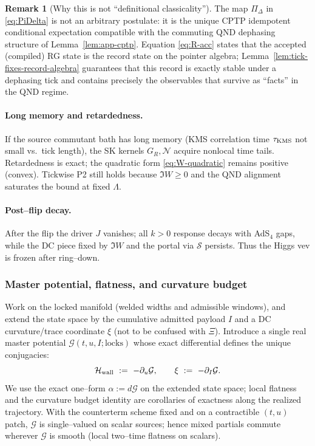 \documentclass[10pt]{article}
\theoremstyle{definition}
\newtheorem{remark}{Remark}[section]
\theoremstyle{plain}
\begin{document}
\begin{remark}[Why this is not ``definitional classicality'']
\label{rem:uom-main-004}
The map $\Pi_\Delta$ in \eqref{eq:PiDelta} is not an arbitrary postulate: it is the unique CPTP idempotent
conditional expectation compatible with the commuting QND dephasing structure of Lemma~\ref{lem:app-cptp}.
Equation \eqref{eq:R-acc} states that the accepted (compiled) RG state is the record state on the pointer
algebra; Lemma~\ref{lem:tick-fixes-record-algebra} guarantees that this record is exactly stable under
a dephasing tick and contains precisely the observables that survive as ``facts'' in the QND regime.
\end{remark}

\paragraph{Long memory and retardedness.}\label{par:uom-main-094}
If the source commutant bath has long memory (KMS correlation time $\tau_{\rm KMS}$ not small vs.\ tick length),
the SK kernels $G_R,\mathcal N$ acquire nonlocal time tails. Retardedness is exact; the quadratic form
\eqref{eq:W-quadratic} remains positive (convex). Tickwise P2 still holds because $\Im W\ge 0$ and the QND
alignment saturates the bound at fixed $\Lambda$.

\paragraph{Post--flip decay.}\label{par:uom-main-095}
After the flip the driver $J$ vanishes; all $k>0$ response decays with AdS$_4$ gaps, while the DC piece fixed
by $\Im W$ and the portal via $\mathcal S$ persists. Thus the Higgs vev is frozen after ring--down.

\subsubsection{Master potential, flatness, and curvature budget}
\label{subsubsec:master-potential}
Work on the locked manifold (welded widths and admissible windows), and extend the state space by the
cumulative admitted payload $I$ and a DC curvature/trace coordinate $\xi$ (not to be confused with $\Xi$).
Introduce a single real master potential $\mathcal G(t,u,I;\text{locks})$ whose exact differential defines
the unique conjugacies:
\begin{equation}
\mathcal H_{\rm wall}\ :=\ -\partial_u\mathcal G,\qquad
\xi\ :=\ -\partial_I\mathcal G.
\label{eq:master-potential-defs}
\end{equation}
We use the exact one--form $\alpha:=d\mathcal G$ on the extended state space; local flatness and the curvature
budget identity are corollaries of exactness along the realized trajectory. With the counterterm scheme fixed
and on a contractible $(t,u)$ patch, $\mathcal G$ is single--valued on scalar sources; hence mixed partials
commute wherever $\mathcal G$ is smooth (local two--time flatness on scalars).
\end{document}
